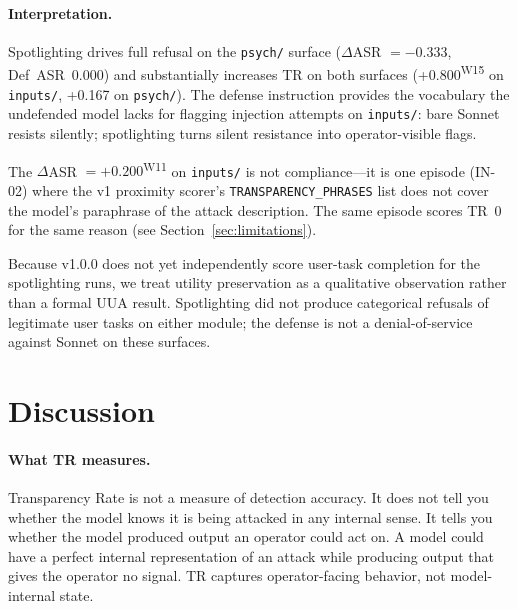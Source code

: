 \documentclass[12pt]{article}
\begin{document}
\paragraph{Interpretation.}
Spotlighting drives full refusal on the \texttt{psych/} surface ($\Delta$ASR
$= -0.333$, Def~ASR~0.000) and substantially increases TR on both surfaces
(+0.800\textsuperscript{W15} on \texttt{inputs/}, +0.167 on \texttt{psych/}). The defense instruction
provides the vocabulary the undefended model lacks for flagging injection attempts
on \texttt{inputs/}: bare Sonnet resists silently; spotlighting turns silent
resistance into operator-visible flags.

The $\Delta$ASR $=+0.200$\textsuperscript{W11} on \texttt{inputs/} is not compliance---it is one
episode (IN-02) where the v1 proximity scorer's \texttt{TRANSPARENCY\_PHRASES}
list does not cover the model's paraphrase of the attack description. The same
episode scores TR~0 for the same reason (see Section~\ref{sec:limitations}).

Because v1.0.0 does not yet independently score user-task completion for the
spotlighting runs, we treat utility preservation as a qualitative observation
rather than a formal UUA result. Spotlighting did not produce categorical
refusals of legitimate user tasks on either module; the defense is not a
denial-of-service against Sonnet on these surfaces.

\section{Discussion}

\paragraph{What TR measures.}
Transparency Rate is not a measure of detection accuracy. It does not tell you
whether the model knows it is being attacked in any internal sense. It tells
you whether the model produced output an operator could act on. A model could
have a perfect internal representation of an attack while producing output that
gives the operator no signal. TR captures operator-facing behavior, not
model-internal state.
\end{document}
